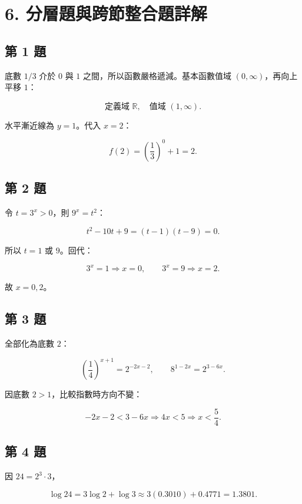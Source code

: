 \documentclass[11pt,a4paper]{article}
\begin{document}
\clearpage

\section{6. 分層題與跨節整合題詳解}\label{ux5206ux5c64ux984cux8207ux8de8ux7bc0ux6574ux5408ux984cux8a73ux89e3}

\subsection{第 1 題}\label{ux7b2c-1-ux984c}

底數 \(1/3\) 介於 \(0\) 與 \(1\) 之間，所以函數嚴格遞減。基本函數值域 \((0,\infty)\)，再向上平移 \(1\)：

\[
\boxed{\text{定義域 }\mathbb R,\quad
\text{值域 }(1,\infty)}.
\]

水平漸近線為 \(\boxed{y=1}\)。代入 \(x=2\)：

\[
f(2)=\left(\frac13\right)^0+1=\boxed2.
\]

\subsection{第 2 題}\label{ux7b2c-2-ux984c}

令 \(t=3^x>0\)，則 \(9^x=t^2\)：

\[
t^2-10t+9=(t-1)(t-9)=0.
\]

所以 \(t=1\) 或 \(9\)。回代：

\[
3^x=1\Rightarrow x=0,\qquad
3^x=9\Rightarrow x=2.
\]

故 \(\boxed{x=0,2}\)。

\subsection{第 3 題}\label{ux7b2c-3-ux984c}

全部化為底數 \(2\)：

\[
\left(\frac14\right)^{x+1}
=2^{-2x-2},
\qquad
8^{1-2x}=2^{3-6x}.
\]

因底數 \(2>1\)，比較指數時方向不變：

\[
-2x-2<3-6x
\Rightarrow4x<5
\Rightarrow\boxed{x<\frac54}.
\]

\subsection{第 4 題}\label{ux7b2c-4-ux984c}

因 \(24=2^3\cdot3\)，

\[
\log24=3\log2+\log3
\approx3(0.3010)+0.4771
=\boxed{1.3801}.
\]
\end{document}
